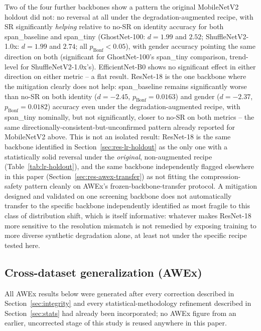 \documentclass[11pt]{article}
\begin{document}
Two of the four further backbones show a pattern the original MobileNetV2 holdout did not: no reversal at all under the degradation-augmented recipe, with SR significantly \emph{helping} relative to no-SR on identity accuracy for both span\_baseline and span\_tiny (GhostNet-100: $d{=}1.99$ and $2.52$; ShuffleNetV2-1.0x: $d{=}1.99$ and $2.74$; all $p_{\text{Bonf}}{<}0.05$), with gender accuracy pointing the same direction on both (significant for GhostNet-100's span\_tiny comparison, trend-level for ShuffleNetV2-1.0x's). EfficientNet-B0 shows no significant effect in either direction on either metric -- a flat result. ResNet-18 is the one backbone where the mitigation clearly does not help: span\_baseline remains significantly worse than no-SR on both identity ($d{=}{-}2.45$, $p_{\text{Bonf}}{=}0.0163$) and gender ($d{=}{-}2.37$, $p_{\text{Bonf}}{=}0.0182$) accuracy even under the degradation-augmented recipe, with span\_tiny nominally, but not significantly, closer to no-SR on both metrics -- the same directionally-consistent-but-unconfirmed pattern already reported for MobileNetV2 above. This is not an isolated result: ResNet-18 is the same backbone identified in Section~\ref{sec:res-lr-holdout} as the only one with a statistically solid reversal under the \emph{original}, non-augmented recipe (Table~\ref{tab:lr-holdout}), and the same backbone independently flagged elsewhere in this paper (Section~\ref{sec:res-awex-transfer}) as not fitting the compression-safety pattern cleanly on AWEx's frozen-backbone-transfer protocol. A mitigation designed and validated on one screening backbone does not automatically transfer to the specific backbone independently identified as most fragile to this class of distribution shift, which is itself informative: whatever makes ResNet-18 more sensitive to the resolution mismatch is not remedied by exposing training to more diverse synthetic degradation alone, at least not under the specific recipe tested here.

\subsection{Cross-dataset generalization (AWEx)}
\label{sec:res-awex}

All AWEx results below were generated after every correction described in Section~\ref{sec:integrity} and every statistical-methodology refinement described in Section~\ref{sec:stats} had already been incorporated; no AWEx figure from an earlier, uncorrected stage of this study is reused anywhere in this paper.
\end{document}
